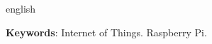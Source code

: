 \begin{resumo}[Abstract]
\begin{otherlanguage*}{english}

	\textbf{Keywords}: Internet of Things. Raspberry Pi.
\end{otherlanguage*}
\end{resumo}
